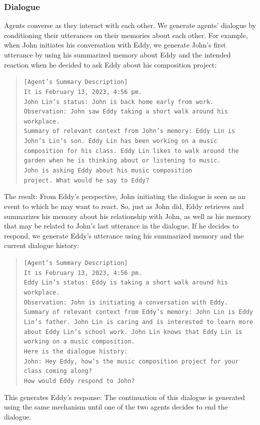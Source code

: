\subsubsection{Dialogue}
Agents converse as they interact with each other. We generate agents' dialogue by conditioning their utterances on their memories about each other. For example, when John initiates his conversation with Eddy, we generate John's first utterance by using his summarized memory about Eddy and the intended reaction when he decided to ask Eddy about his composition project:
\begin{quote}
    {\small
    \texttt{[Agent’s Summary Description]\\
            It is February 13, 2023, 4:56 pm.\\ 
            John Lin’s status: John is back home early from work.\\ 
            Observation: John saw Eddy taking a short walk around his workplace.\\
            Summary of relevant context from John’s memory: Eddy Lin is John’s Lin’s son. Eddy Lin has been working on a music composition for his class. Eddy Lin likes to walk around the garden when he is thinking about or listening to music.\\
            John is asking Eddy about his music composition \\project. What would he say to Eddy?}
    }
\end{quote}
The result:  From Eddy's perspective, John initiating the dialogue is seen as an event to which he may want to react. So, just as John did, Eddy retrieves and summarizes his memory about his relationship with John, as well as his memory that may be related to John's last utterance in the dialogue. If he decides to respond, we generate Eddy's utterance using his summarized memory and the current dialogue history:
\begin{quote}
    {\small
    \texttt{[Agent’s Summary Description]\\
            It is February 13, 2023, 4:56 pm.\\
            Eddy Lin’s status: Eddy is taking a short walk around his workplace.\\
            Observation: John is initiating a conversation with Eddy.\\
            Summary of relevant context from Eddy’s memory: John Lin is Eddy Lin’s father. John Lin is caring and is interested to learn more about Eddy Lin’s school work. John Lin knows that Eddy Lin is working on a music composition. \\
            Here is the dialogue history: \\
            John: Hey Eddy, how's the music composition project for your class coming along? \\
            How would Eddy respond to John?}
    }
\end{quote}
This generates Eddy's response:  The continuation of this dialogue is generated using the same mechanism until one of the two agents decides to end the dialogue.

